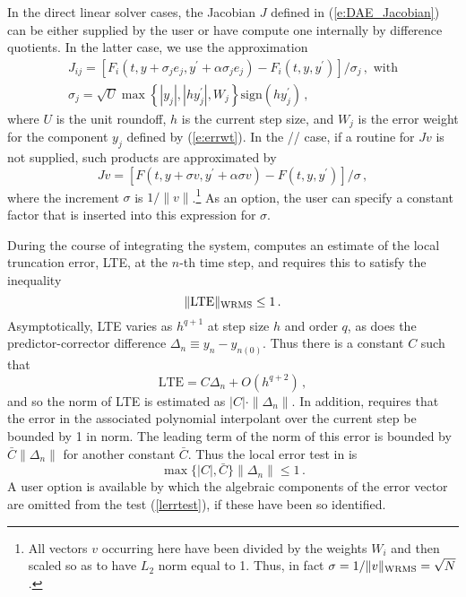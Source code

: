 In the direct linear solver 
cases, the Jacobian $J$ defined in (\ref{e:DAE_Jacobian}) 
can be either supplied by the user or have {\ida} compute one internally 
by difference quotients. In the latter case, we use the approximation
\begin{gather*}
  J_{ij} = [F_i(t,y+\sigma_j e_j,y^\prime+\alpha\sigma_j e_j) - 
            F_i(t,y,y^\prime)]/\sigma_j \, , \text{ with}\\
  \sigma_j = \sqrt{U} \max \left\{ |y_j|, |hy^\prime_j|,W_j \right\}
             \mbox{sign}(h y^\prime_j) \, ,
\end{gather*}
where $U$ is the unit roundoff, $h$ is the current step size, and $W_j$ is 
the error weight for the component $y_j$ defined by (\ref{e:errwt}).
In the {\spgmr}/{\spbcg}/{\sptfqmr} case, if a routine for $Jv$ is not supplied, such products are
approximated by
\begin{equation*}
Jv = [F(t,y+\sigma v,y^\prime+\alpha\sigma v) - F(t,y,y^\prime)]/\sigma \, ,
\end{equation*}
where the increment $\sigma$ is $1/\|v\|$.\footnote{All vectors $v$ 
occurring here have been divided by the weights $W_i$ and then scaled 
so as to have $L_2$ norm equal to 1. 
Thus, in fact $\sigma = 1/\|v\|_{\mbox{\scriptsize WRMS}}=\sqrt{N}$.}
As an option, the user can specify a constant factor that is inserted
into this expression for $\sigma$.

During the course of integrating the system, {\ida} computes an estimate
of the local truncation error, LTE, at the $n$-th time step, and
requires this to satisfy the inequality
\begin{equation*}
  \| \mbox{LTE} \|_{\mbox{\scriptsize WRMS}} \leq 1 \, .               
\end{equation*}
Asymptotically, LTE varies as $h^{q+1}$ at step size $h$ and order $q$, as
does the predictor-corrector difference $\Delta_n \equiv y_n-y_{n(0)}$.  
Thus there is a constant $C$ such that
\[ \mbox{LTE} = C \Delta_n + O(h^{q+2}) \, , \]
and so the norm of LTE is estimated as $|C| \cdot \|\Delta_n\|$.
In addition, {\ida} requires that the error in the associated polynomial
interpolant over the current step be bounded by 1 in norm.  The
leading term of the norm of this error is bounded by
$\bar{C} \|\Delta_n\|$ for another constant $\bar{C}$.  Thus the local
error test in {\ida} is
\begin{equation}\label{lerrtest}
   \max\{ |C|, \bar{C} \} \|\Delta_n\| \leq 1 \, .
\end{equation}
A user option is available by which the algebraic components of the
error vector are omitted from the test (\ref{lerrtest}), if these have
been so identified.

